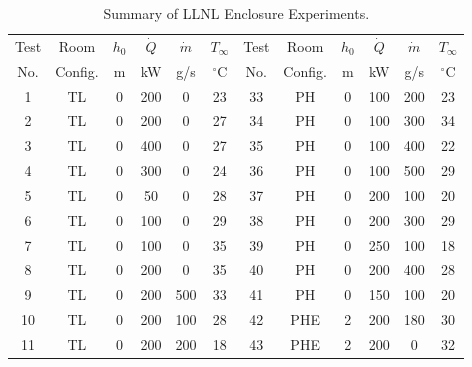 \begin{table}[p]
\caption[Summary of LLNL Enclosure Experiments]{Summary of LLNL Enclosure Experiments.}
\begin{center}
\begin{tabular}{|c|c|c|c|c|c||c|c|c|c|c|c|}
\hline
Test & Room    & $h_0$ &  $\dot{Q}$ & $\dot{m}$ & $T_\infty$  &   Test & Room    & $h_0$ &  $\dot{Q}$ & $\dot{m}$ & $T_\infty$  \\              
No.  & Config. & m     &  kW        & g/s       & $^\circ$C   &   No.  & Config. & m     &  kW        & g/s       & $^\circ$C   \\ \hline \hline
1    & TL      & 0     & 200        & 0         & 23          &   33   & PH      & 0     & 100        & 200       & 23          \\ \hline              
2    & TL      & 0     & 200        & 0         & 27          &   34   & PH      & 0     & 100        & 300       & 34          \\ \hline              
3    & TL      & 0     & 400        & 0         & 27          &   35   & PH      & 0     & 100        & 400       & 22          \\ \hline              
4    & TL      & 0     & 300        & 0         & 24          &   36   & PH      & 0     & 100        & 500       & 29          \\ \hline              
5    & TL      & 0     & 50         & 0         & 28          &   37   & PH      & 0     & 200        & 100       & 20          \\ \hline              
6    & TL      & 0     & 100        & 0         & 29          &   38   & PH      & 0     & 200        & 300       & 29          \\ \hline              
7    & TL      & 0     & 100        & 0         & 35          &   39   & PH      & 0     & 250        & 100       & 18          \\ \hline              
8    & TL      & 0     & 200        & 0         & 35          &   40   & PH      & 0     & 200        & 400       & 28          \\ \hline              
9    & TL      & 0     & 200        & 500       & 33          &   41   & PH      & 0     & 150        & 100       & 20          \\ \hline              
10   & TL      & 0     & 200        & 100       & 28          &   42   & PHE     & 2     & 200        & 180       & 30          \\ \hline              
11   & TL      & 0     & 200        & 200       & 18          &   43   & PHE     & 2     & 200        & 0         & 32          \\ \hline              

\end{tabular}
\end{center}
\end{table}

